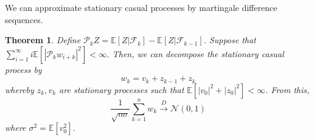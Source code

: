 \documentclass[twoside]{article}
\newcounter{lecnum}
\newtheorem{theorem}{Theorem}[lecnum]
\begin{document}
We can approximate stationary casual processes by martingale difference sequences.
\begin{theorem} Define $\mathcal{P}_kZ = \mathbb{E}[Z|\mathcal{F}_k] - \mathbb{E}[Z|\mathcal{F}_{k - 1}]$. Suppose that $\sum_{i=1}^{\infty}i\mathbb{E}[|\mathcal{P}_kw_{i+k}|^2] < \infty.$ Then, we can decompose the stationary casual process by 
$$
w_k = v_k + z_{k-1} + z_k
$$
whereby $z_k, v_k$ are stationary processes such that $\mathbb{E}[|v_0|^2 + |z_0|^2] < \infty$. From this, 
$$
\frac{1}{\sqrt{n \sigma}}\sum_{k=1}^{n}w_k \xrightarrow{D} \mathcal{N}(0,1)
$$
where $\sigma^2 = \mathbb{E}[v_0^2].$
\end{theorem}
\end{document}
